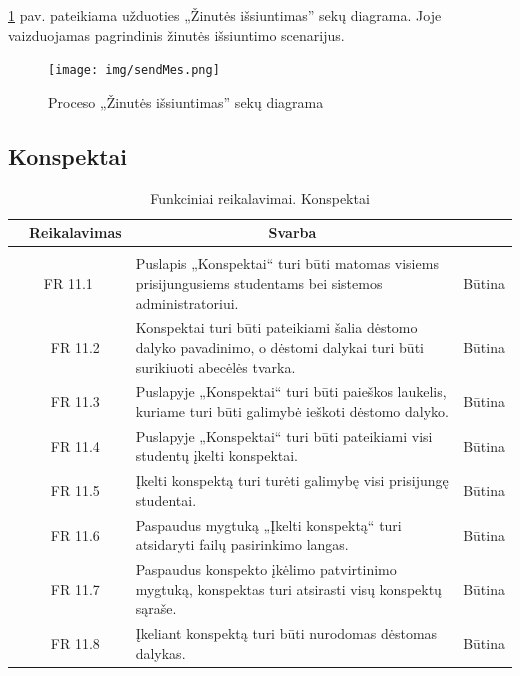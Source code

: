 \documentclass{VUMIFPSkursinis}
\begin{document}
\ref{fig:sendmessage} pav. pateikiama užduoties „Žinutės išsiuntimas” sekų diagrama. Joje vaizduojamas pagrindinis žinutės išsiuntimo scenarijus.
\begin{figure}[H]
	\centering
	\texttt{[image: img/sendMes.png]}
	\caption{Proceso „Žinutės išsiuntimas” sekų diagrama}
	\label{fig:sendmessage}
\end{figure}

\subsection{Konspektai}

	\begin{table}[H]
	\caption{Funkciniai reikalavimai. Konspektai}
	\begin{tabular}{|p{1cm}|p{1cm}|p{}|p{}|}
		\hline 
		\rowcolor{gray!50}
		\multicolumn{2}{|c|}{{\bfseries Kodas}}&
		\multicolumn{1}{c|}{{\bfseries Reikalavimas}}&
		\multicolumn{1}{c|}{{\bfseries Svarba}}\\
		\hline
		\rowcolor{lightgray}
		\multicolumn{4}{|c|}{Konspektai}\\		
		
		\hline
		\multicolumn{2}{|c|}{FR 11.1}&
		{Puslapis „Konspektai“ turi būti matomas visiems prisijungusiems studentams bei sistemos administratoriui.
		}&		
		\multicolumn{1}{c|}{Būtina}\\
		\hline
		\multicolumn{1}{|c}{}&
		\multicolumn{1}{c|}{FR 11.2}&
		{Konspektai turi būti pateikiami šalia dėstomo dalyko pavadinimo, o dėstomi dalykai turi būti surikiuoti abecėlės tvarka.
		}&		
		\multicolumn{1}{c|}{Būtina}\\
		\hline
		\multicolumn{1}{|c}{}&
		\multicolumn{1}{c|}{FR 11.3}&
		{Puslapyje „Konspektai“ turi būti paieškos laukelis, kuriame turi būti galimybė ieškoti dėstomo dalyko.
		}&
		\multicolumn{1}{c|}{Būtina}\\	
		\hline		
		\multicolumn{1}{|c}{}&
		\multicolumn{1}{c|}{FR 11.4}&
		{Puslapyje „Konspektai“ turi būti pateikiami visi studentų įkelti konspektai.
		}&
		\multicolumn{1}{c|}{Būtina}\\									
		\hline
		\multicolumn{1}{|c}{}&
		\multicolumn{1}{c|}{FR 11.5}&
		{Įkelti konspektą turi turėti galimybę visi prisijungę studentai.
		}&
		\multicolumn{1}{c|}{Būtina}\\	
		\hline	
		\multicolumn{1}{|c}{}&
		\multicolumn{1}{c|}{FR 11.6}&
		{Paspaudus mygtuką „Įkelti konspektą“ turi atsidaryti failų pasirinkimo langas.
		}&
		\multicolumn{1}{c|}{Būtina}\\	
		\hline		
		\multicolumn{1}{|c}{}&
		\multicolumn{1}{c|}{FR 11.7}&
		{Paspaudus konspekto įkėlimo patvirtinimo mygtuką, konspektas turi atsirasti visų konspektų sąraše.
		}&
		\multicolumn{1}{c|}{Būtina}\\									
		\hline
		\multicolumn{1}{|c}{}&
		\multicolumn{1}{c|}{FR 11.8}&
		{Įkeliant konspektą turi būti nurodomas dėstomas dalykas.
		}&
		\multicolumn{1}{c|}{Būtina}\\	
		\hline		
	\end{tabular}		
\end{table}
\end{document}
